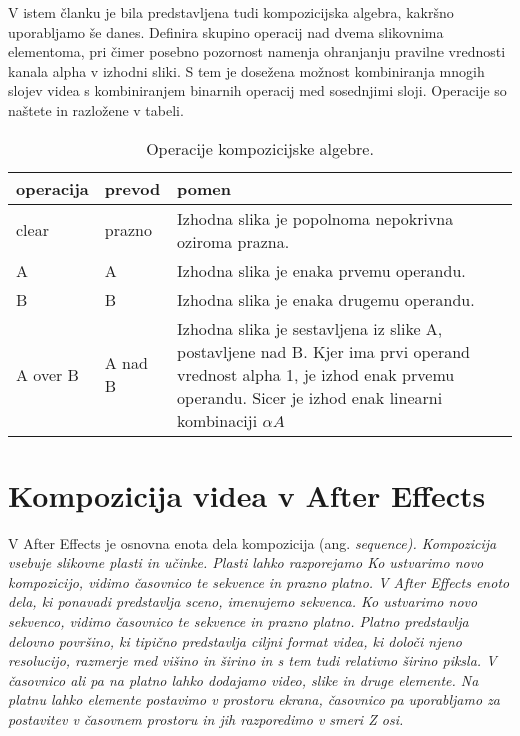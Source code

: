 \documentclass[a4paper, 12pt]{book}
\begin{document}
V istem članku je bila predstavljena tudi kompozicijska algebra, kakršno uporabljamo še danes.
Definira skupino operacij nad dvema slikovnima elementoma, pri čimer posebno pozornost namenja ohranjanju pravilne vrednosti kanala alpha v izhodni sliki.
S tem je dosežena možnost kombiniranja mnogih slojev videa s kombiniranjem binarnih operacij med sosednjimi sloji.
Operacije so naštete in razložene v tabeli. %

\begin{table}
\begin{center}
\begin{tabular}{p{} | p{} | p{} }
\hline
{\bf operacija} & {\bf prevod } & {\bf pomen} \\ \hline
clear & prazno & Izhodna slika je popolnoma nepokrivna oziroma prazna. \\ \hline
A & A & Izhodna slika je enaka prvemu operandu. \\
B & B & Izhodna slika je enaka drugemu operandu. \\ \hline
A over B & A nad B & Izhodna slika je sestavljena iz slike A, postavljene nad B. Kjer ima prvi operand vrednost alpha 1, je izhod enak prvemu operandu. 
Sicer je izhod enak linearni kombinaciji $\alpha A  $  \\ %
\end{tabular}
\end{center}
\caption{Operacije kompozicijske algebre.}
\label{tbl:kompOperacije}
\end{table}




\section{Kompozicija videa v After Effects}

V After Effects je osnovna enota dela kompozicija (ang. \it{sequence}).
Kompozicija vsebuje slikovne plasti in učinke. 
Plasti lahko razporejamo
Ko ustvarimo novo kompozicijo, vidimo časovnico te sekvence in prazno platno.
V After Effects enoto dela, ki ponavadi predstavlja sceno, imenujemo sekvenca\cite{aeclassroom}.
Ko ustvarimo novo sekvenco, vidimo časovnico te sekvence in prazno platno.
Platno predstavlja delovno površino, ki tipično predstavlja ciljni format videa, ki določi njeno resolucijo, razmerje med višino in širino in s tem tudi relativno širino piksla.
V časovnico ali pa na platno lahko dodajamo video, slike in druge elemente.
Na platnu lahko elemente postavimo v prostoru ekrana,
časovnico pa uporabljamo za postavitev v časovnem prostoru in jih razporedimo v smeri Z osi.
\end{document}
